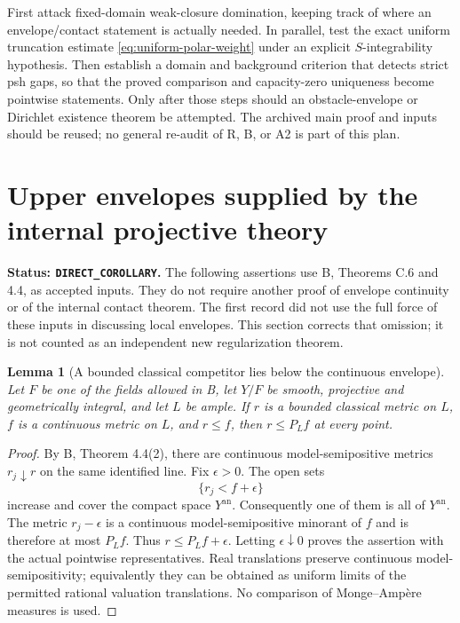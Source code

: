\documentclass[11pt,a4paper]{article}
\numberwithin{equation}{section}
\newtheorem{lemma}[theorem]{Lemma}
\theoremstyle{definition}
\theoremstyle{remark}
\newcommand{\an}{\mathrm{an}}
\begin{document}
First attack fixed-domain weak-closure domination, keeping track of
where an envelope/contact statement is actually needed. In parallel,
test the exact uniform truncation estimate
\eqref{eq:uniform-polar-weight} under an explicit $S$-integrability
hypothesis. Then establish a domain and background criterion that
detects strict psh gaps, so that the proved comparison and capacity-zero
uniqueness become pointwise statements. Only after those steps should
an obstacle-envelope or Dirichlet existence theorem be attempted.
The archived main proof and inputs should be reused; no general
re-audit of R, B, or A2 is part of this plan.



\section{Upper envelopes supplied by the internal projective theory}
\label{sec:r2-upper-envelopes}

\noindent\textbf{Status: \texttt{DIRECT\_COROLLARY}.}
The following assertions use \textup{B}, Theorems C.6 and 4.4, as
accepted inputs. They do not require another proof of envelope
continuity or of the internal contact theorem. The first record did
not use the full force of these inputs in discussing local envelopes.
This section corrects that omission; it is not counted as an
independent new regularization theorem.

\begin{lemma}[A bounded classical competitor lies below the continuous envelope]
\label{lem:r2-envelope-competitor}
Let $F$ be one of the fields allowed in \textup{B}, let $Y/F$ be smooth,
projective and geometrically integral, and let $L$ be ample. If $r$ is
a bounded classical metric on $L$, $f$ is a continuous metric on $L$,
and $r\leq f$, then $r\leq P_L f$ at every point.
\end{lemma}

\begin{proof}
By \textup{B}, Theorem 4.4(2), there are continuous model-semipositive
metrics $r_j\downarrow r$ on the same identified line. Fix
$\epsilon>0$. The open sets
\[
 \{r_j<f+\epsilon\}
\]
increase and cover the compact space $Y^{\an}$. Consequently one of
them is all of $Y^{\an}$. The metric $r_j-\epsilon$ is a continuous
model-semipositive minorant of $f$ and is therefore at most $P_Lf$.
Thus $r\leq P_Lf+\epsilon$. Letting $\epsilon\downarrow0$ proves the
assertion with the actual pointwise representatives. Real translations
preserve continuous model-semipositivity; equivalently they can be
obtained as uniform limits of the permitted rational valuation
translations. No comparison of Monge--Amp\`ere measures is used.
\end{proof}
\end{document}
